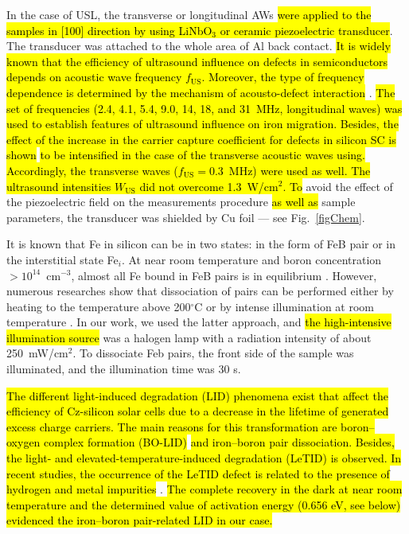 \documentclass[sn-mathphys]{sn-jnl}%
\theoremstyle{thmstyleone}%
\theoremstyle{thmstyletwo}%
\theoremstyle{thmstylethree}%
\begin{document}
In the case of USL, the transverse or longitudinal AWs
\hl{were applied to the samples in [100] direction by using LiNbO$_3$ or ceramic piezoelectric transducer}.
The transducer was attached to the whole area of Al back contact.
\hl{It is widely known that the efficiency of ultrasound influence
on  defects in semiconductors depends on acoustic wave frequency $f_\mathrm{US}$.
Moreover, the type of frequency dependence is determined by the mechanism of acousto-defect
interaction} \cite{Brailsford,Pavlovich,PeleshchakUJF2016}.
\hl{ The set of frequencies (2.4, 4.1, 5.4, 9.0, 14, 18, and 31~MHz, longitudinal waves)
was used  to establish features of
ultrasound influence on iron migration.
Besides,  the effect of the increase in the carrier capture coefficient for defects in silicon SC
is shown} \cite{Olikh2018SM} \hl{ to be intensified in the case of the transverse acoustic waves using.
Accordingly, the transverse waves ($f_\mathrm{US}=0.3$~MHz) were used as well.
The ultrasound intensities $W_\mathrm{US}$  did not overcome 1.3~W/cm$^2$.
To} avoid the effect of the piezoelectric field on the measurements procedure \hl{as well as} sample parameters,
the transducer was shielded by Cu foil --- see Fig.~\ref{figChem}.

It is known that Fe in silicon can be in two states:
in the form of FeB pair or in the interstitial state Fe$_i$.
At near room temperature and boron concentration $>10^{14}$~cm$^{-3}$,
almost all Fe bound in FeB pairs is in equilibrium \cite{FeB:kinetic,FeBAssJAP2014,FeBAssSST2011,FeBJAP2005}.
However, numerous researches show that dissociation of pairs can be performed either by heating to the temperature above 200$^\circ$C
or by intense illumination at room temperature \cite{FeBAssJAP2014,FeBJAP2005}.
In our work, we used the latter approach,
and \hl{the high-intensive illumination source} was a halogen lamp
with a radiation intensity of about 250~mW/cm$^2$.
To dissociate Feb pairs, the front side of the sample was illuminated, and the illumination time was  30 s.

\hl{The different light-induced degradation (LID) phenomena exist that affect the efficiency
of Cz-silicon solar cells due to a decrease in the lifetime of generated excess charge carriers.
The main reasons for this transformation are boron--oxygen complex formation (BO-LID)} \cite{LIDRev}
\hl{ and
iron--boron pair dissociation.
Besides, the light- and elevated-temperature-induced degradation (LeTID) is observed.
In recent studies, the occurrence of the LeTID defect is related
to the presence of hydrogen and metal impurities }\cite{LeTID_H,LeTID_Me,LeTID_Me2}.
\hl{ The complete  recovery in the dark at near room temperature and the determined value
of activation energy (0.656 eV, see below) evidenced the iron--boron pair-related LID in our case.}
\end{document}
